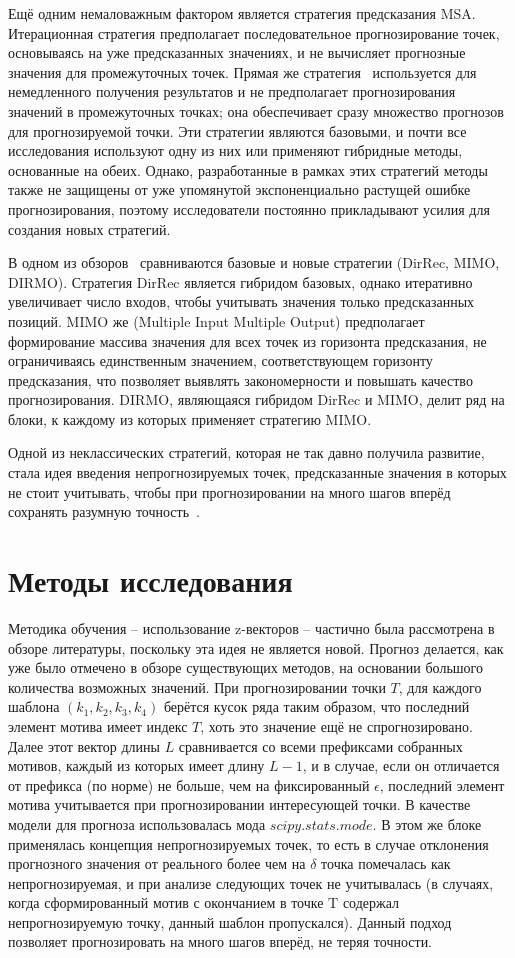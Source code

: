 \documentclass[a4paper, 12pt]{extarticle}
\begin{document}
Ещё одним немаловажным фактором является стратегия предсказания MSA. Итерационная стратегия предполагает последовательное прогнозирование точек, основываясь на уже предсказанных значениях, и не вычисляет прогнозные значения для промежуточных точек. Прямая же стратегия~\cite{Taieb12} используется для немедленного получения результатов и не предполагает прогнозирования значений в промежуточных точках; она обеспечивает сразу множество прогнозов для прогнозируемой точки. Эти стратегии являются базовыми, и почти все исследования используют одну из них или применяют гибридные методы, основанные на обеих. Однако, разработанные в рамках этих стратегий методы также не защищены от уже упомянутой экспоненциально растущей ошибке прогнозирования, поэтому исследователи постоянно прикладывают усилия для создания новых стратегий.

В одном из обзоров~\cite{Taieb12} сравниваются базовые и новые стратегии (DirRec, MIMO, DIRMO). Стратегия DirRec является гибридом базовых, однако итеративно увеличивает число входов, чтобы учитывать значения только предсказанных позиций. MIMO же (Multiple Input Multiple Output) предполагает формирование массива значения для всех точек из горизонта предсказания, не ограничиваясь единственным значением, соответствующем горизонту предсказания, что позволяет выявлять закономерности и повышать качество прогнозирования. DIRMO, являющаяся гибридом DirRec и MIMO, делит ряд на блоки, к каждому из которых применяет стратегию MIMO.

Одной из неклассических стратегий, которая не так давно получила развитие, стала идея введения непрогнозируемых точек, предсказанные значения в которых не стоит учитывать, чтобы при прогнозировании на много шагов вперёд сохранять разумную точность~\cite{Gromov15}.

\newpage
\section{Методы исследования}

Методика обучения – использование z-векторов – частично была рассмотрена в обзоре литературы, поскольку эта идея не является новой. Прогноз делается, как уже было отмечено в обзоре существующих методов, на основании большого количества возможных значений. При прогнозировании точки $T$, для каждого шаблона $(k_1,k_2,k_3,k_4)$ берётся кусок ряда таким образом, что последний элемент мотива имеет индекс $T$, хоть это значение ещё не спрогнозировано. Далее этот вектор длины $L$ сравнивается со всеми префиксами собранных мотивов, каждый из которых имеет длину $L-1$, и в случае, если он отличается от префикса (по норме) не больше, чем на фиксированный $\epsilon$, последний элемент мотива учитывается при прогнозировании интересующей точки. В качестве модели для прогноза использовалась мода $scipy.stats.mode$. В этом же блоке применялась концепция непрогнозируемых точек, то есть в случае отклонения прогнозного значения от реального более чем на $\delta$ точка помечалась как непрогнозируемая, и при анализе следующих точек не учитывалась (в случаях, когда сформированный мотив с окончанием в точке T содержал непрогнозируемую точку, данный шаблон пропускался). Данный подход позволяет прогнозировать на много шагов вперёд, не теряя точности.
\end{document}
